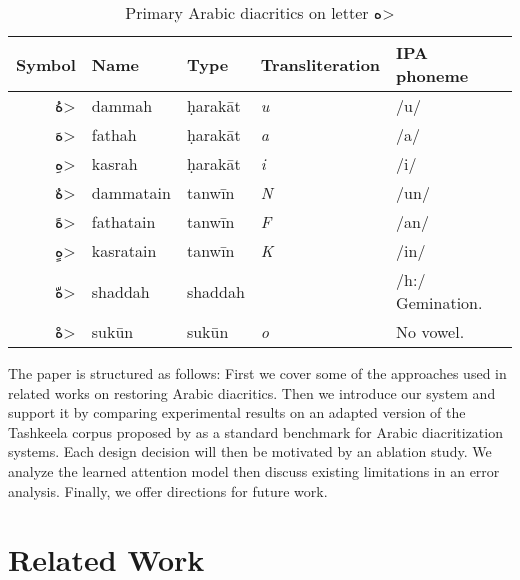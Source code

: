 \documentclass[11pt]{article}
\begin{document}
\begin{table}[ht]
\begin{center}
\begin{tabular}{|r|l|l|l|l|}
\hline 
\bf Symbol & \bf Name & \bf Type & \bf Transliteration & \bf IPA phoneme \\ \hline
\<هُ> & dammah       & \d{h}arakāt   & \it u & /u/ \\
\<هَ> & fathah       & \d{h}arakāt   & \it a & /a/ \\
\<هِ> & kasrah       & \d{h}arakāt   & \it i & /i/ \\
\<هٌ> & dammatain    & tanwīn        & \it N & /un/ \\
\<هً> & fathatain    & tanwīn        & \it F & /an/ \\
\<هٍ> & kasratain    & tanwīn        & \it K & /in/ \\
\<هّ> & shaddah      & shaddah       &  &  /h:/ Gemination. \\
\<هْ> & sukūn        & sukūn         & \it o & No vowel. \\
\hline
\end{tabular}
\end{center}
\caption{Primary Arabic diacritics on letter \<ه>}
\label{diac-table}
\end{table}

The paper is structured as follows: First we cover some of the approaches used in related works on restoring Arabic diacritics. Then we introduce our system and support it by comparing experimental results on an adapted version of the Tashkeela corpus \cite{tashkeela17} proposed by \cite{fadel19} as a standard benchmark for Arabic diacritization systems. Each design decision will then be motivated by an ablation study. We analyze the learned attention model then discuss existing limitations in an error analysis. Finally, we offer directions for future work.

\section{Related Work}
\end{document}
